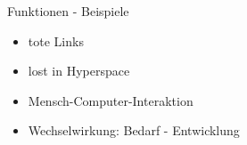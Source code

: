 \documentclass{beamer}
\begin{document}
\begin{frame}{Funktionen - Beispiele}
\begin{itemize}
	\item tote Links
	\item lost in Hyperspace
	\item Mensch-Computer-Interaktion
	\item Wechselwirkung: Bedarf - Entwicklung
\end{itemize}
\end{frame}












\end{document}

